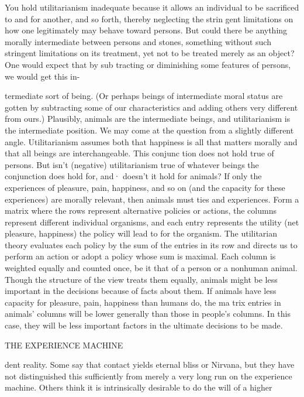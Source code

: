 \documentclass[11pt,openany]{book}
\begin{document}
{You hold utilitarianism inadequate because it allows an individual to be sacrificed to and for another, and so forth, thereby neglecting the strin gent limitations on how one legitimately may behave toward persons. But could there be anything morally intermediate between persons and stones, something without such stringent limitations on its treatment, yet not to be treated merely as an object? One would expect that by sub tracting or diminishing some features of persons, we would get this in-\par

termediate sort of being. (Or perhaps beings of intermediate moral status are gotten by subtracting some of our characteristics and adding others very different from ours.) Plausibly, animals are the intermediate beings, and utilitarianism is the intermediate position. We may come at the question from a slightly different angle. Utilitarianism assumes both that happiness is all that matters morally and that all beings are interchangeable. This conjunc tion does not hold true of persons. But isn't (negative) utilitarianism true of whatever beings the conjunction does hold for, and· doesn't it hold for animals? If only the experiences of pleasure, pain, happiness, and so on (and the capacity for these experiences) are morally relevant, then animals must ties and experiences. Form a matrix where the rows represent alternative policies or actions, the columns represent different individual organisms, and each entry represents the utility (net pleasure, happiness) the policy will lead to for the organism. The utilitarian theory evaluates each policy by the sum of the entries in its row and directs us to perform an action or adopt a policy whose sum is maximal. Each column is weighted equally and counted once, be it that of a person or a nonhuman animal. Though the structure of the view treats them equally, animals might be less important in the decisions because of facts about them. If animals have less capacity for pleasure, pain, happiness than humans do, the ma trix entries in animals' columns will be lower generally than those in people's columns. In this case, they will be less important factors in the ultimate decisions to be made.\par

THE EXPERIENCE MACHINE\par

dent reality. Some say that contact yields eternal bliss or Nirvana, but they have not distinguished this sufficiently from merely a very long run on the experience machine. Others think it is intrinsically desirable to do the will of a higher\par

}
\end{document}
